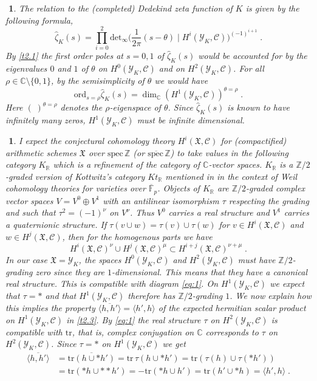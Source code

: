 \documentclass[12pt,leqno]{article}
\newcommand{\C}{{\mathbb{C}}}
\newcommand{\F}{{\mathbb{F}}}
\newcommand{\oF}{\overline{\F}}
\newcommand{\R}{{\mathbb{R}}}
\newcommand{\Z}{{\mathbb{Z}}}
\newcommand{\ddet}{\mathrm{det}}
\newcommand{\ord}{\mathrm{ord}}
\newcommand{\spec}{\mathrm{spec}\,}
\newcommand{\tr}{\mathrm{tr}}
\newcommand{\Ch}{{\mathcal C}}
\newcommand{\Yh}{\mathcal{Y}}
\newcommand{\eX}{{\mathfrak X}}
\newcommand{\hzeta}{\hat{\zeta}}
\newtheorem{punkt}[theorem]{$\!\!$}
\begin{document}
\begin{punkt} \label{t2.4} \em 
The relation to the (completed) Dedekind zeta function of $K$ is given by the following formula, \cite{D0}
\[
\hzeta_K (s) = \prod^2_{i=0} \ddet_{\infty} \Big( \frac{1}{2\pi} (s- \theta) \mid H^i (\Yh_K , \Ch) \Big)^{(-1)^{i+1}} \; .
\]
By \ref{t2.1} the first order poles at $s = 0,1$ of $\hzeta_K (s)$ would be accounted for by the eigenvalues $0$ and $1$ of $\theta$ on $H^0 (\Yh_K , \Ch)$ and on $H^2 (\Yh_K , \Ch)$. For all $\rho \in \C \setminus \{ 0, 1 \}$, by the semisimplicity of $\theta$ we would have
\begin{equation} \label{eq:2n}
\ord_{s = \rho} \hzeta_K (s) = \dim_{\C} (H^1 (\Yh_K , \Ch))^{\theta = \rho} \; .
\end{equation}
Here $(\;)^{\theta = \rho}$ denotes the $\rho$-eigenspace of $\theta$. Since $\hzeta_K (s)$ is known to have infinitely many zeros, $H^1 (\Yh_K , \Ch)$ must be infinite dimensional. 
\end{punkt}
\begin{punkt} \label{t2.5} \em 
I expect the conjectural cohomology theory $H^i (\eX, \Ch)$ for (compactified) arithmetic schemes $\eX$ over $\spec \Z$ (or $\overline{\spec} \Z$) to take values in the following category $K_{\R}$ which is a refinement of the category of $\C$-vector spaces. $K_{\R}$ is a $\Z / 2$-graded version of Kottwitz's category $Kt_{\R}$ mentioned in \cite[Conjecture 9.5]{S} in the context of Weil cohomology theories for varieties over $\oF_p$. Objects of $K_{\R}$ are $\Z / 2$-graded complex vector spaces $V = V^0 \oplus V^1$ with an antilinear isomorphism $\tau$ respecting the grading and such that $\tau^2 = (-1)^{\nu}$ on $V^{\nu}$. Thus $V^0$ carries a real structure and $V^1$ carries a quaternionic structure. If $\tau (v \cup w) = \tau (v) \cup \tau (w)$ for $v \in H^i (\eX , \Ch)$ and $w \in H^j (\eX , \Ch)$, then for the homogenous parts we have
\[
H^i (\eX , \Ch)^{\nu} \cup H^j (\eX , \Ch)^{\mu} \subset H^{i+j} (\eX , \Ch)^{\nu + \mu} \; .
\]
In our case $\eX = \Yh_K$, the spaces $H^0 (\Yh_K , \Ch)$ and $H^2 (\Yh_K , \Ch)$ must have $\Z / 2$-grading zero since they are $1$-dimensional. This means that they have a canonical real structure. This is compatible with diagram \eqref{eq:1}. On $H^1 (\Yh_K , \Ch)$ we expect that $\tau = *$ and that $H^1 (\Yh_K , \Ch)$ therefore has $\Z / 2$-grading $1$. We now explain how this implies the property $\overline{\langle h , h' \rangle} = \langle h' , h \rangle$ of the expected hermitian scalar product on $H^1 (\Yh_K , \Ch)$ in \ref{t2.3}. By \eqref{eq:1} the real structure $\tau$ on $H^2 (\Yh_K , \Ch)$ is compatible with $\tr$, that is, complex conjugation on $\C$ corresponds to $\tau$ on $H^2 (\Yh_K , \Ch)$. Since $\tau = *$ on $H^1 (\Yh_K , \Ch)$ we get
\begin{align*}
\overline{\langle h, h' \rangle} & = \overline{\tr (h \cup *h')} = \tr \, \tau (h \cup * h') = \tr (\tau (h) \cup \tau (* h')) \\
& = \tr (*h \cup ** h') = - \tr (* h \cup h') = \tr (h' \cup *h) = \langle h' , h \rangle \; .
\end{align*}
\end{punkt}
\end{document}
